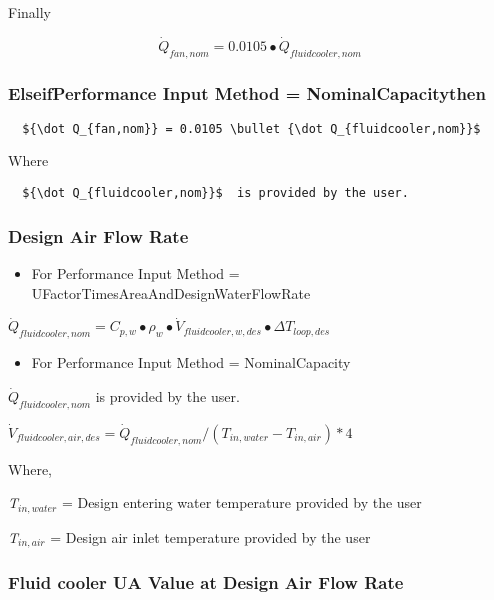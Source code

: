Finally

\begin{equation}
{\dot Q_{fan,nom}} = 0.0105 \bullet {\dot Q_{fluidcooler,nom}}
\end{equation}

\subsubsection{ElseifPerformance Input Method = NominalCapacitythen}\label{elseifperformance-input-method-nominalcapacitythen}

\begin{lstlisting}
  ${\dot Q_{fan,nom}} = 0.0105 \bullet {\dot Q_{fluidcooler,nom}}$ 
\end{lstlisting}

Where

\begin{lstlisting}
  ${\dot Q_{fluidcooler,nom}}$  is provided by the user.
\end{lstlisting}

\subsubsection{Design Air Flow Rate}\label{design-air-flow-rate-1}

\begin{itemize}
\tightlist
\item
  For Performance Input Method = UFactorTimesAreaAndDesignWaterFlowRate
\end{itemize}

\({\dot Q_{fluidcooler,nom}} = {C_{p,w}} \bullet {\rho_w} \bullet {\dot V_{fluidcooler,w,des}} \bullet \Delta {T_{loop,des}}\)

\begin{itemize}
\tightlist
\item
  For Performance Input Method = NominalCapacity
\end{itemize}

\({\dot Q_{fluidcooler,nom}}\) is provided by the user.

\({\dot V_{fluidcooler,air,des}} = {\dot Q_{fluidcooler,nom}}/({T_{in,water}} - {T_{in,air}})*4\)

Where,

\emph{T\(_{in,water}\)} = Design entering water temperature provided by the user

\emph{T\(_{in,air}\)} = Design air inlet temperature provided by the user

\subsubsection{Fluid cooler UA Value at Design Air Flow Rate}\label{fluid-cooler-ua-value-at-design-air-flow-rate}

